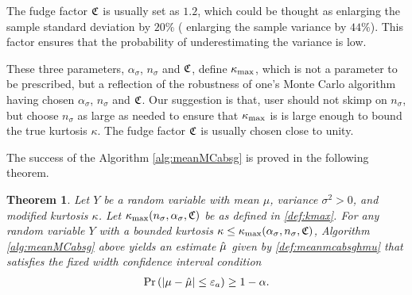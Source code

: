 \documentclass{iitthesis}
\newtheorem{theorem}{Theorem}[section]
\theoremstyle{definition}
\begin{document}
The fudge factor $\mathfrak{C}$ is usually set as $1.2$, which could be thought as enlarging the sample standard deviation by $20\%$ ( enlarging the sample variance by $44\%$). This factor ensures that the probability of underestimating the variance is low. 

These three parameters, $\alpha_\sigma$, $n_\sigma$ and $\mathfrak{C}$, define $\kappa_{\max}$, which is not a parameter to be prescribed, but a reflection of the robustness of one's Monte Carlo algorithm having chosen $\alpha_\sigma$, $n_\sigma$ and $\mathfrak{C}$. Our suggestion is that, user should not skimp on $n_\sigma$, but choose $n_\sigma$ as large as needed to ensure that $\kappa_{\max}$ is is large enough to bound the true kurtosis $\kappa$. The fudge factor $\mathfrak{C}$ is usually chosen close to unity.

The success of the Algorithm \ref{alg:meanMCabsg} is proved in the following theorem.
\begin{theorem} \cite[Theorem 5]{HJLO12}\label{thm:meanMCabsg}
Let $Y$ be a random variable with mean $\mu$, variance $\sigma^2 >0$, and modified kurtosis $\kappa$. Let $\kappa_{\max}(n_\sigma,\alpha_\sigma,\mathfrak{C})$ be as defined in \eqref{def:kmax}. For any random variable $Y$ with a bounded kurtosis $\kappa\leq\kappa_{\max}(\alpha_{\sigma},n_{\sigma},\mathfrak{C})$, Algorithm \ref{alg:meanMCabsg} above yields an estimate $\hat{\mu}$ given by \eqref{def:meanmcabsghmu} that satisfies the fixed width confidence interval condition
\begin{align}
\Pr\left( \left \lvert \mu-\hat{\mu} \right \rvert \leq \varepsilon_a \right) \geq 1-\alpha.
\end{align}
\end{theorem}
\end{document}
